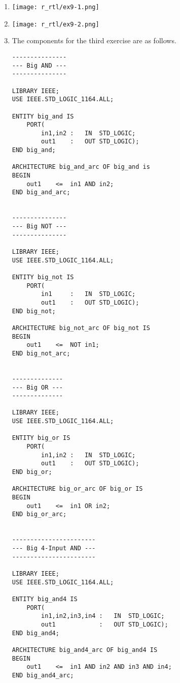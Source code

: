 \begin{enumerate}
	\item
	\begin{minipage}[t]{1\linewidth}
		\vspace{0pt}\raggedright
		\centering
		\texttt{[image: r\_rtl/ex9-1.png]}
	\end{minipage}

\item
\begin{minipage}[t]{1\linewidth}
	\vspace{0pt}\raggedright
	\centering
	\texttt{[image: r\_rtl/ex9-2.png]}
\end{minipage}
\item The components for the third exercise are as follows.
\begin{lstlisting}
---------------
--- Big AND ---
---------------

LIBRARY IEEE;
USE IEEE.STD_LOGIC_1164.ALL;

ENTITY big_and IS
	PORT(
		in1,in2	:	IN	STD_LOGIC;
		out1	:	OUT	STD_LOGIC);
END big_and;

ARCHITECTURE big_and_arc OF big_and is
BEGIN
	out1	<=	in1 AND in2;
END big_and_arc;


---------------
--- Big NOT ---
---------------

LIBRARY IEEE;
USE IEEE.STD_LOGIC_1164.ALL;

ENTITY big_not IS
	PORT(
		in1		:	IN	STD_LOGIC;
		out1	:	OUT	STD_LOGIC);
END big_not;

ARCHITECTURE big_not_arc OF big_not IS
BEGIN
	out1	<=	NOT in1;
END big_not_arc;


--------------
--- Big OR ---
--------------

LIBRARY IEEE;
USE IEEE.STD_LOGIC_1164.ALL;

ENTITY big_or IS
	PORT(
		in1,in2	:	IN	STD_LOGIC;
		out1	:	OUT	STD_LOGIC);
END big_or;

ARCHITECTURE big_or_arc OF big_or IS
BEGIN
	out1	<=	in1 OR in2;
END big_or_arc;


-----------------------
--- Big 4-Input AND ---
-----------------------

LIBRARY IEEE;
USE IEEE.STD_LOGIC_1164.ALL;

ENTITY big_and4 IS
	PORT(
		in1,in2,in3,in4	:	IN	STD_LOGIC;
		out1			:	OUT	STD_LOGIC);
END big_and4;

ARCHITECTURE big_and4_arc OF big_and4 IS
BEGIN
	out1	<=	in1 AND in2 AND in3 AND in4;
END big_and4_arc;



\end{lstlisting}
\end{enumerate}
